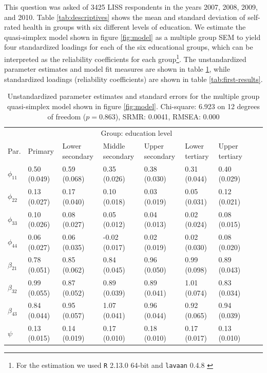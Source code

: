 \documentclass[a4paper,11pt]{article}
\newcommand{\0}{\boldsymbol{0}}
\newcommand{\R}{\texttt{R} 2.13.0 64-bit \citep{R}\;}
\newcommand{\lavaan}{\texttt{lavaan} 0.4.8 \citep{lavaan}\;}
\begin{document}
This question was asked of 3425 LISS respondents in the years 2007, 2008, 2009, and 2010. 
Table \ref{tab:descriptives} shows the mean and standard deviation of self-rated health in
groups with six different levels of education.
We estimate the quasi-simplex model shown in figure \ref{fig:model} as a multiple group SEM
to yield four standardized loadings for each of the six educational groups, which can be interpreted as the reliability coefficients for each group\footnote{For the estimation we used \R and \lavaan}. The unstandardized parameter estimates and model fit measures are shown in table \ref{tab:results-unstandardized}, while standardized loadings (reliability coefficients) are shown in table \ref{tab:first-results}.

\begin{table}\begin{small}
\begin{tabularx}{\textwidth}{l*{8}{X}}
  \hline  \hline
  	& \multicolumn{6}{c}{Group: education level}\\	\cline{2-7}
    Par.  &       Primary         & Lower secondary & Middle secondary & Upper secondary & Lower tertiary & Upper tertiary\\
  \hline
$\phi_{11}$   & 0.50 (0.049) & 0.59 (0.068) & 0.35 (0.026) & 0.38 (0.030) & 0.31 (0.044) & 0.40 (0.029) \\ 
$\phi_{22}$   & 0.13 (0.027) & 0.17 (0.040) & 0.10 (0.018) & 0.03 (0.019) & 0.05 (0.031) & 0.12 (0.021) \\ 
$\phi_{33}$   & 0.10 (0.026) & 0.08 (0.027) & 0.05 (0.012) & 0.04 (0.013) & 0.02 (0.024) & 0.08 (0.015) \\ 
$\phi_{44}$   & 0.06 (0.027) & 0.06 (0.035) & -0.02 (0.017) & 0.02 (0.019) & 0.02 (0.030) & 0.08 (0.020) \\ 
$\beta_{21}$  & 0.78 (0.051) & 0.85 (0.062) & 0.84 (0.045) & 0.96 (0.050) & 0.99 (0.098) & 0.89 (0.043) \\ 
$\beta_{32}$  & 0.99 (0.055) & 0.87 (0.052) & 0.89 (0.039) & 0.89 (0.041) & 1.01 (0.074) & 0.83 (0.034) \\ 
$\beta_{43}$  & 0.84 (0.044) & 0.95 (0.057) & 1.07 (0.041) & 0.96 (0.044) & 0.92 (0.065) & 0.94 (0.039) \\ 
$\psi$   & 0.13 (0.015) & 0.14 (0.019) & 0.17 (0.010) & 0.18 (0.010) & 0.17 (0.017) & 0.13 (0.010) \\ 
     \hline  \hline
\end{tabularx}\caption{Unstandardized parameter estimates and standard errors for the 
multiple group quasi-simplex model shown in figure \ref{fig:model}.
Chi-square:  6.923 on  12 degrees of freedom  ($p = 0.863$),  SRMR:  0.0041, RMSEA: 0.000}
\label{tab:results-unstandardized}
\end{small}\end{table}
\end{document}
